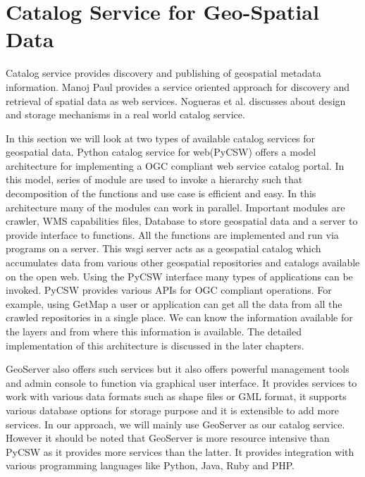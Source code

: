 \section{Catalog Service for Geo-Spatial Data}
Catalog service provides discovery and publishing of geospatial metadata information. Manoj Paul\cite{l14} provides a service oriented approach for discovery and retrieval of spatial data as web services. Nogueras et al.\cite{l15} discusses about design and storage mechanisms in a real world catalog service. 
\newline
\par In this section we will look at two types of available catalog services for geospatial data. Python catalog service for web(PyCSW)\cite{l7} offers a model architecture for implementing a OGC compliant web service catalog portal. In this model, series of module are used to invoke a hierarchy such that decomposition of the functions and use case is efficient and easy. In this architecture many of the modules can work in parallel. Important modules are crawler, WMS capabilities files, Database to store geospatial data and a server to provide interface to functions. All the functions are implemented and run via programs on a server. This wsgi server acts as a geospatial catalog which accumulates data from various other geospatial repositories and catalogs available on the open web. Using the PyCSW interface many types of applications can be invoked. PyCSW provides various APIs for OGC compliant operations. For example, using GetMap a user or application can get all the data from all the crawled repositories in a single place. We can know the information available for the layers and from where this information is available. The detailed implementation of this architecture is discussed in the later chapters.\\
\par
GeoServer\cite{l10} also offers such services but it also offers powerful management tools and admin console to function via graphical user interface. It provides services to work with various data formats such as shape files or GML format, it supports various database options for storage purpose and it is extensible to add more services. In our approach, we will mainly use GeoServer as our catalog service. However it should be noted that GeoServer is more resource intensive than PyCSW as it provides more services than the latter. It provides integration with various programming languages like Python, Java, Ruby and PHP.
